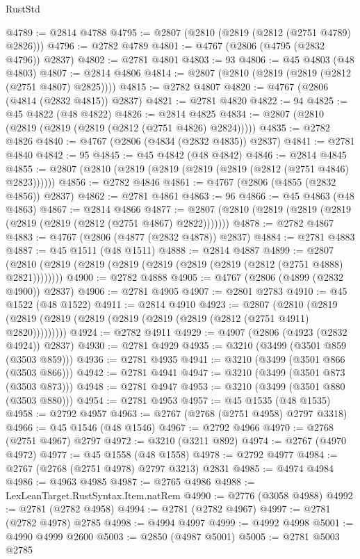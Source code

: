\begin{lexlean}{RustStd}
\begin{coremodule}
@4789 := @2814 @4788
@4795 := @2807 (@2810 (@2819 (@2812 (@2751 @4789) @2826)))
@4796 := @2782 @4789
@4801 := @4767 (@2806 (@4795 (@2832 @4796)) @2837)
@4802 := @2781 @4801
@4803 := 93
@4806 := @45 @4803 (@48 @4803)
@4807 := @2814 @4806
@4814 := @2807 (@2810 (@2819 (@2819 (@2812 (@2751 @4807) @2825))))
@4815 := @2782 @4807
@4820 := @4767 (@2806 (@4814 (@2832 @4815)) @2837)
@4821 := @2781 @4820
@4822 := 94
@4825 := @45 @4822 (@48 @4822)
@4826 := @2814 @4825
@4834 := @2807 (@2810 (@2819 (@2819 (@2819 (@2812 (@2751 @4826) @2824)))))
@4835 := @2782 @4826
@4840 := @4767 (@2806 (@4834 (@2832 @4835)) @2837)
@4841 := @2781 @4840
@4842 := 95
@4845 := @45 @4842 (@48 @4842)
@4846 := @2814 @4845
@4855 := @2807 (@2810 (@2819 (@2819 (@2819 (@2819 (@2812 (@2751 @4846) @2823))))))
@4856 := @2782 @4846
@4861 := @4767 (@2806 (@4855 (@2832 @4856)) @2837)
@4862 := @2781 @4861
@4863 := 96
@4866 := @45 @4863 (@48 @4863)
@4867 := @2814 @4866
@4877 := @2807 (@2810 (@2819 (@2819 (@2819 (@2819 (@2819 (@2812 (@2751 @4867) @2822)))))))
@4878 := @2782 @4867
@4883 := @4767 (@2806 (@4877 (@2832 @4878)) @2837)
@4884 := @2781 @4883
@4887 := @45 @1511 (@48 @1511)
@4888 := @2814 @4887
@4899 := @2807 (@2810 (@2819 (@2819 (@2819 (@2819 (@2819 (@2819 (@2812 (@2751 @4888) @2821))))))))
@4900 := @2782 @4888
@4905 := @4767 (@2806 (@4899 (@2832 @4900)) @2837)
@4906 := @2781 @4905
@4907 := @2801 @2783
@4910 := @45 @1522 (@48 @1522)
@4911 := @2814 @4910
@4923 := @2807
    (@2810 (@2819 (@2819 (@2819 (@2819 (@2819 (@2819 (@2819 (@2812 (@2751 @4911) @2820)))))))))
@4924 := @2782 @4911
@4929 := @4907 (@2806 (@4923 (@2832 @4924)) @2837)
@4930 := @2781 @4929
@4935 := @3210 (@3499 (@3501 @859 (@3503 @859)))
@4936 := @2781 @4935
@4941 := @3210 (@3499 (@3501 @866 (@3503 @866)))
@4942 := @2781 @4941
@4947 := @3210 (@3499 (@3501 @873 (@3503 @873)))
@4948 := @2781 @4947
@4953 := @3210 (@3499 (@3501 @880 (@3503 @880)))
@4954 := @2781 @4953
@4957 := @45 @1535 (@48 @1535)
@4958 := @2792 @4957
@4963 := @2767 (@2768 (@2751 @4958) @2797 @3318)
@4966 := @45 @1546 (@48 @1546)
@4967 := @2792 @4966
@4970 := @2768 (@2751 @4967) @2797
@4972 := @3210 (@3211 @892)
@4974 := @2767 (@4970 @4972)
@4977 := @45 @1558 (@48 @1558)
@4978 := @2792 @4977
@4984 := @2767 (@2768 (@2751 @4978) @2797 @3213) @2831
@4985 := @4974 @4984
@4986 := @4963 @4985
@4987 := @2765 @4986
@4988 := LexLeanTarget.RustSyntax.Item.natRem
@4990 := @2776 (@3058 @4988)
@4992 := @2781 (@2782 @4958)
@4994 := @2781 (@2782 @4967)
@4997 := @2781 (@2782 @4978) @2785
@4998 := @4994 @4997
@4999 := @4992 @4998
@5001 := @4990 @4999 @2600
@5003 := @2850 (@4987 @5001)
@5005 := @2781 @5003 @2785

\end{coremodule}
\end{lexlean}
